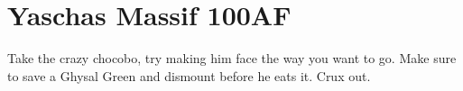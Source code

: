 \chapter{Yaschas Massif 100AF}

Take the crazy chocobo, try making him face the way you want to go. Make sure to save a Ghysal Green and dismount before he eats it.  Crux out.
\newline